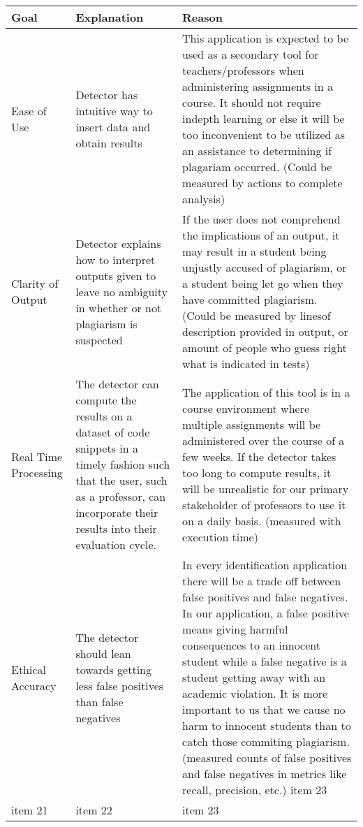\documentclass{article}
\begin{document}
\begin{center}
  \hspace*{-2cm} \begin{tabularx}{1.5\textwidth} { 
  | >{\raggedright\arraybackslash}X 
  | >{\raggedright\arraybackslash}X 
  | >{\raggedright\arraybackslash}X | }
 \hline
Goal & 
Explanation & 
Reason \\
 \hline
Ease of Use  & 
Detector has intuitive way to insert data and obtain results & 
This application is expected to be used as a secondary tool for teachers/professors when administering assignments in a course. It should not require indepth learning or else it will be too inconvenient to be utilized as an assistance to determining if plagariam occurred.  (Could be measured by actions to complete analysis)\\
 \hline
 Clarity of Output  & 
Detector explains how to interpret outputs given to leave no ambiguity in whether or not plagiarism is suspected  & 
If the user does not comprehend the implications of an output, it may result in a student being unjustly accused of plagiarism, or a student being let go when they have committed plagiarism. (Could be measured by linesof description provided in output, or amount of people who guess right what is indicated in tests)\\
 \hline
Real Time Processing  & 
The detector can compute the results on a dataset of code snippets in a timely fashion such that the user, such as a professor, can incorporate their results into their evaluation cycle. & 
 The application of this tool is in a course environment where multiple assignments will be administered over the course of a few weeks. If the detector takes too long to compute results, it will be unrealistic for our primary stakeholder of professors to use it on a daily basis. (measured with execution time) \\
 \hline
 Ethical Accuracy  & 
The detector should lean towards getting less false positives than false negatives  & In every identification application there will be a trade off between false positives and false negatives. In our application, a false positive means giving harmful consequences to an innocent student while a false negative is a student getting away with an academic violation. It is more important to us that we cause no harm to innocent students than to catch those commiting plagiarism. (measured counts of false positives and false negatives in metrics like recall, precision, etc.)
 item 23  \\
 \hline
 item 21  & 
 item 22  & 
 item 23  \\
\hline
\end{tabularx}
\end{center}
\end{document}
